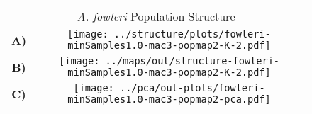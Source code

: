 \documentclass[border=10pt,varwidth=30cm]{standalone}
\begin{document}
\begin{figure}
\begin{tabular}[t]{cc}
    \multicolumn{2}{c}{\Large \textit{A. fowleri} Population Structure} \\
  {\textbf{\large A)}} & \texttt{[image: ../structure/plots/fowleri-minSamples1.0-mac3-popmap2-K-2.pdf]} \\ \vspace{1mm}
  {\textbf{\large B)}} & \texttt{[image: ../maps/out/structure-fowleri-minSamples1.0-mac3-popmap2-K-2.pdf]} \\
  {\textbf{\large C)}} & \texttt{[image: ../pca/out-plots/fowleri-minSamples1.0-mac3-popmap2-pca.pdf]} \\
\end{tabular}
\end{figure}
\end{document}
